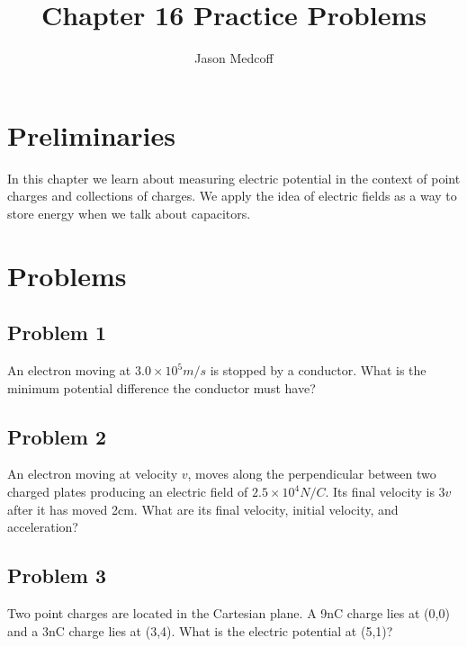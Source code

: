 \documentclass{article}
\title{Chapter 16 Practice Problems}
\author{Jason Medcoff}
\date{}
\begin{document}
	
	\maketitle
	
	\section{Preliminaries}
	In this chapter we learn about measuring electric potential in the context of point charges and collections of charges. We apply the idea of electric fields as a way to store energy when we talk about capacitors.
	
	\section{Problems}
	
	\subsection{Problem 1}
	
	An electron moving at $3.0 \times 10^5 m/s$ is stopped by a conductor. What is the minimum potential difference the conductor must have? 
	\newline \newline \newline \newline \newline 
	\newline \newline \newline \newline \newline 
	
	\subsection{Problem 2}
	
	An electron moving at velocity $v$, moves along the perpendicular between two charged plates producing an electric field of $2.5 \times 10^4 N/C$. Its final velocity is $3v$ after it has moved 2cm. What are its final velocity, initial velocity, and acceleration?
	\newline \newline \newline \newline \newline 
	\newline \newline \newline \newline \newline 
		
		
	\subsection{Problem 3}
	
	Two point charges are located in the Cartesian plane. A 9nC charge lies at (0,0) and a 3nC charge lies at (3,4). What is the electric potential at (5,1)?
	
	
	
	
	
\end{document}
